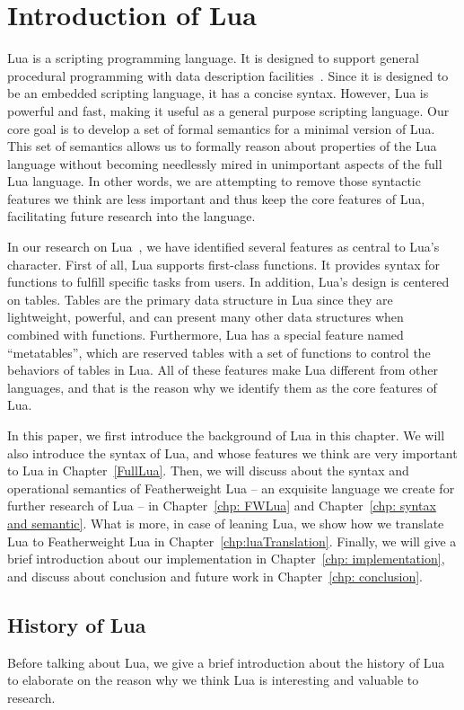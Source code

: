 \chapter{Introduction of Lua}
Lua is a scripting programming language. It is designed to support general procedural programming with data description facilities~\cite{EEL}. Since it is designed to be an embedded scripting language, it has a concise syntax. However, Lua is powerful and fast, making it useful as a general purpose scripting language.
Our core goal is to develop a set of formal semantics for a minimal version of Lua. This set of semantics allows us to formally reason about properties of the Lua language without becoming needlessly mired in unimportant aspects of the full Lua language. In other words, we are attempting to remove those syntactic features we think are less important and thus keep the core features of Lua, facilitating future research into the language.

In our research on Lua~\cite{LRM}, we have identified several features as central to Lua's character. First of all, Lua supports first-class functions. It provides syntax for functions to fulfill specific tasks from users. In addition, Lua's design is centered on tables. Tables are the primary data structure in Lua since they are lightweight, powerful, and can present many other data structures when combined with functions. Furthermore, Lua has a special feature named ``metatables'', which are reserved tables with a set of functions to control the behaviors of tables in Lua. All of these features make Lua different from other languages, and that is the reason why we identify them as the core features of Lua.

In this paper, we first introduce the background of Lua in this chapter. We will also introduce the syntax of Lua, and whose features we think are very important to Lua in Chapter~\ref{FullLua}. Then, we will discuss about the syntax and operational semantics of Featherweight Lua -- an exquisite language we create for further research of Lua -- in Chapter~\ref{chp: FWLua} and Chapter~\ref{chp: syntax and semantic}. What is more, in case of leaning Lua, we show how we translate Lua to Featherweight Lua in Chapter~\ref{chp:luaTranslation}. Finally, we will give a brief introduction about our implementation in Chapter~\ref{chp: implementation}, and discuss about conclusion and future work in Chapter~\ref{chp: conclusion}.


\section{History of Lua}
Before talking about Lua, we give a brief introduction about the history of Lua to elaborate on the reason why we think Lua is interesting and valuable to research.

